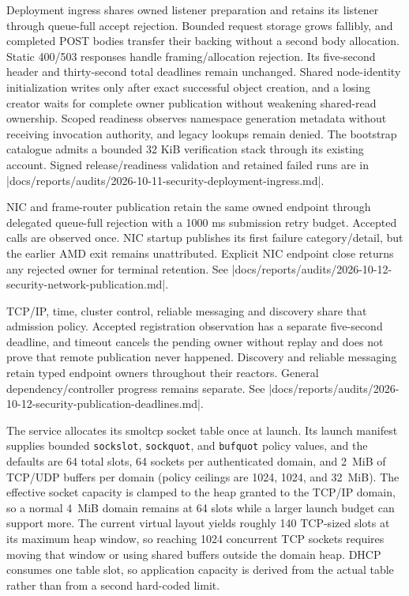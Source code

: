 Deployment ingress shares owned listener preparation and retains its listener
through queue-full accept rejection. Bounded request storage grows fallibly, and
completed POST bodies transfer their backing without a second body allocation.
Static 400/503 responses handle framing/allocation rejection. Its five-second
header and thirty-second total deadlines remain unchanged. Shared node-identity
initialization writes only after exact successful object creation, and a losing
creator waits for complete owner publication without weakening shared-read
ownership. Scoped readiness observes namespace generation metadata without
receiving invocation authority, and legacy lookups remain denied. The bootstrap
catalogue admits a bounded 32 KiB verification stack through its existing
account. Signed release/readiness validation and retained failed runs are in
\repofile|docs/reports/audits/2026-10-11-security-deployment-ingress.md|.

NIC and frame-router publication retain the same owned endpoint through
delegated queue-full rejection with a 1000 ms submission retry budget. Accepted
calls are observed once. NIC startup publishes its first failure category/detail, but
the earlier AMD exit remains unattributed. Explicit NIC endpoint close returns
any rejected owner for terminal retention. See
\repofile|docs/reports/audits/2026-10-12-security-network-publication.md|.

TCP/IP, time, cluster control, reliable messaging and discovery share that
admission policy. Accepted registration observation has a separate five-second
deadline, and timeout cancels the pending owner without replay and does not prove
that remote publication never happened. Discovery and reliable messaging retain
typed endpoint owners throughout their reactors. General dependency/controller
progress remains separate. See
\repofile|docs/reports/audits/2026-10-12-security-publication-deadlines.md|.

The service allocates its smoltcp socket table once at launch. Its launch
manifest supplies bounded \texttt{sockslot}, \texttt{sockquot}, and
\texttt{bufquot} policy values, and the defaults are 64 total slots, 64 sockets per
authenticated domain, and 2~MiB of TCP/UDP buffers per domain (policy
ceilings are 1024, 1024, and 32~MiB). The effective socket capacity is clamped
to the heap granted to the TCP/IP domain, so a normal 4~MiB domain remains at
64 slots while a larger launch budget can support more. The current virtual
layout yields roughly 140 TCP-sized slots at its maximum heap window, so reaching
1024 concurrent TCP sockets requires moving that window or using shared
buffers outside the domain heap. DHCP consumes
one table slot, so application capacity is derived from the actual table rather
than from a second hard-coded limit.

